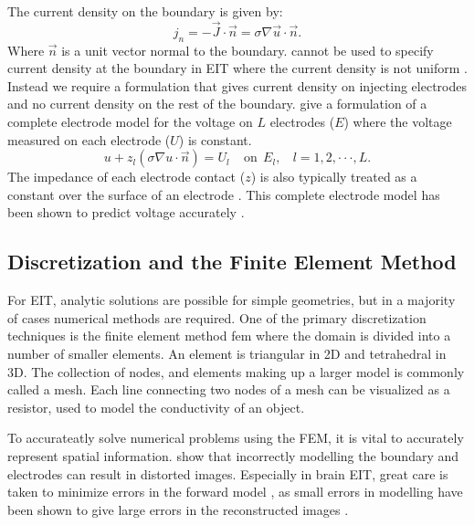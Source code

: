 The current density on the boundary is given by:
\begin{equation} \label{eq:cur_den}
	j_n = -\vec{J} \cdot \vec{n}  = \sigma \nabla \vec{u} \cdot \vec{n}.
\end{equation}
Where $\vec{n}$ is a unit vector normal to the boundary.  cannot be 
used to specify current density at the boundary in EIT where the current density is not 
uniform \parencite{somersalo_existence_1992}. Instead
we require a formulation that gives current density on injecting electrodes 
and no current density on the rest of the boundary.
 give 
a formulation of a complete electrode model for the voltage on $L$ electrodes ($E$)
where the voltage measured on each electrode ($U$) is constant. 
\begin{equation} \label{eq:comp_elec}
	u + z_l (\sigma \nabla u \cdot \vec{n}) = U_l ~~~~~ \text{on} ~~ E_l, ~~~~ l= 1,2,\cdot\cdot\cdot,L.
\end{equation}
The impedance of each electrode contact ($z$) is also typically treated as a constant over the surface of 
an electrode \parencite{somersalo_existence_1992}.
This complete electrode model has been shown 
to predict voltage accurately \parencite{somersalo_existence_1992}.

\subsection{Discretization and the Finite Element Method}
For EIT, analytic solutions are possible for simple geometries, but in a majority of cases
numerical methods are required. 
One of the primary discretization techniques is the finite element method \acrshort{fem}
where the domain is divided into a number of smaller elements. 
An element is
triangular in 2D and tetrahedral in 3D. 
The collection of nodes, and elements making up a larger model is commonly called a mesh. 
Each line connecting two nodes of a mesh can be visualized as a resistor,
used to model the conductivity of an object.

To accurateatly solve numerical problems using the FEM, it is vital to accurately represent 
spatial information.  show that incorrectly modelling 
the boundary and electrodes can result in distorted images. 
Especially in brain EIT, great care is taken to minimize errors in the forward model 
\parencite{aristovich_method_2014,malone_multifrequency_2014}, 
as small errors
in modelling have been shown to give large errors in the reconstructed 
images \parencite{kolehmainen_assessment_1997}. 

